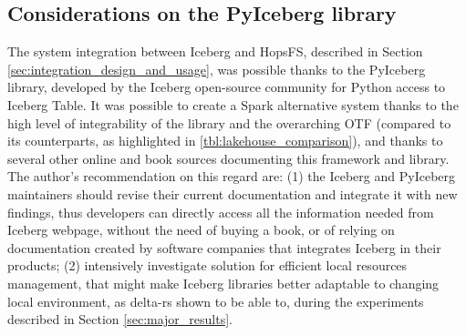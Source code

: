 \subsection{Considerations on the PyIceberg library}
The system integration between Iceberg and \gls{HopsFS}, described in Section \ref{sec:integration_design_and_usage}, was possible thanks to the PyIceberg library, developed by the Iceberg open-source community for Python access to Iceberg Table. It was possible to create a Spark alternative system thanks to the high level of integrability of the library and the overarching \gls{OTF} (compared to its counterparts, as highlighted in \ref{tbl:lakehouse_comparison}), and thanks to several other online and book sources documenting this framework and library. The author's recommendation on this regard are: (1) the Iceberg and PyIceberg maintainers should revise their current documentation and integrate it with new findings, thus developers can directly access all the information needed from Iceberg webpage, without the need of buying a book, or of relying on documentation created by software companies that integrates Iceberg in their products; (2) intensively investigate solution for efficient local resources management, that might make Iceberg libraries better adaptable to changing local environment, as delta-rs shown to be able to, during the experiments described in Section \ref{sec:major_results}.


